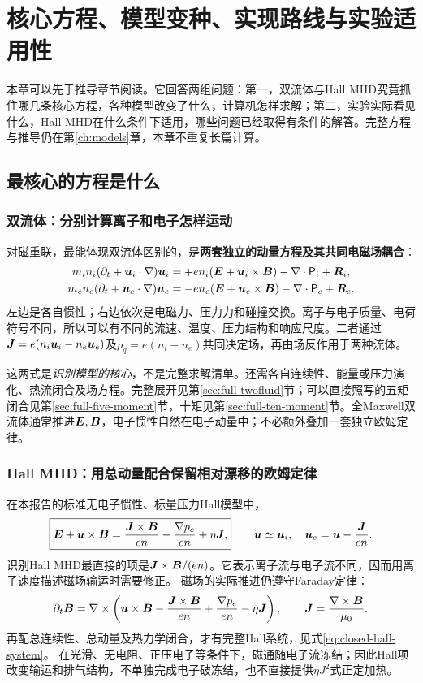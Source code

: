 \chapter{核心方程、模型变种、实现路线与实验适用性}
\label{ch:core-guide}
本章可以先于推导章节阅读。它回答两组问题：第一，双流体与Hall MHD究竟抓住哪几条核心方程，各种模型改变了什么，计算机怎样求解；第二，实验实际看见什么，Hall MHD在什么条件下适用，哪些问题已经取得有条件的解答。完整方程与推导仍在第\ref{ch:models}章，本章不重复长篇计算。

\section{最核心的方程是什么}
\subsection{双流体：分别计算离子和电子怎样运动}
对磁重联，最能体现双流体区别的，是\textbf{两套独立的动量方程及其共同电磁场耦合}：
\begin{align}
 m_in_i(\partial_t+\bm{u}_i\cdot\nabla)\bm{u}_i
 &=+en_i(\bm{E}+\bm{u}_i\times\bm{B})-\nabla\cdot\mathsf P_i+\bm{R}_i,\\
 m_en_e(\partial_t+\bm{u}_e\cdot\nabla)\bm{u}_e
 &=-en_e(\bm{E}+\bm{u}_e\times\bm{B})-\nabla\cdot\mathsf P_e+\bm{R}_e.
\end{align}
左边是各自惯性；右边依次是电磁力、压力力和碰撞交换。离子与电子质量、电荷符号不同，所以可以有不同的流速、温度、压力结构和响应尺度。二者通过
$\bm{J}=e(n_i\bm{u}_i-n_e\bm{u}_e)$及$\rho_q=e(n_i-n_e)$共同决定场，再由场反作用于两种流体。

这两式是\emph{识别模型的核心}，不是完整求解清单。还需各自连续性、能量或压力演化、热流闭合及场方程。完整展开见第\ref{sec:full-twofluid}节；可以直接照写的五矩闭合见第\ref{sec:full-five-moment}节，十矩见第\ref{sec:full-ten-moment}节。全Maxwell双流体通常推进$\bm{E},\bm{B}$，电子惯性自然在电子动量中；不必额外叠加一套独立欧姆定律。\citep{Wang2015}

\subsection{Hall MHD：用总动量配合保留相对漂移的欧姆定律}
在本报告的标准无电子惯性、标量压力Hall模型中，
\begin{equation}
 \boxed{\bm{E}+\bm{u}\times\bm{B}
   =\frac{\bm{J}\times\bm{B}}{en}-\frac{\nabla p_e}{en}+\eta\bm{J},}
 \qquad \bm{u}\simeq\bm{u}_i,\quad \bm{u}_e=\bm{u}-\frac{\bm{J}}{en}.
 \label{eq:guide-core-hall}
\end{equation}
识别Hall MHD最直接的项是$\bm{J}\times\bm{B}/(en)$。它表示离子流与电子流不同，因而用离子速度描述磁场输运时需要修正。
磁场的实际推进仍遵守Faraday定律：
\begin{equation}
 \partial_t\bm{B}=\nabla\times
 \left(\bm{u}\times\bm{B}-\frac{\bm{J}\times\bm{B}}{en}
                    +\frac{\nabla p_e}{en}-\eta\bm{J}\right),
 \qquad \bm{J}=\frac{\nabla\times\bm{B}}{\mu_0}.
\end{equation}
再配总连续性、总动量及热力学闭合，才有完整Hall系统，见式\eqref{eq:closed-hall-system}。
在光滑、无电阻、正压电子等条件下，磁通随电子流冻结；因此Hall项改变输运和排气结构，不单独完成电子破冻结，也不直接提供$\eta J^2$式正定加热。

